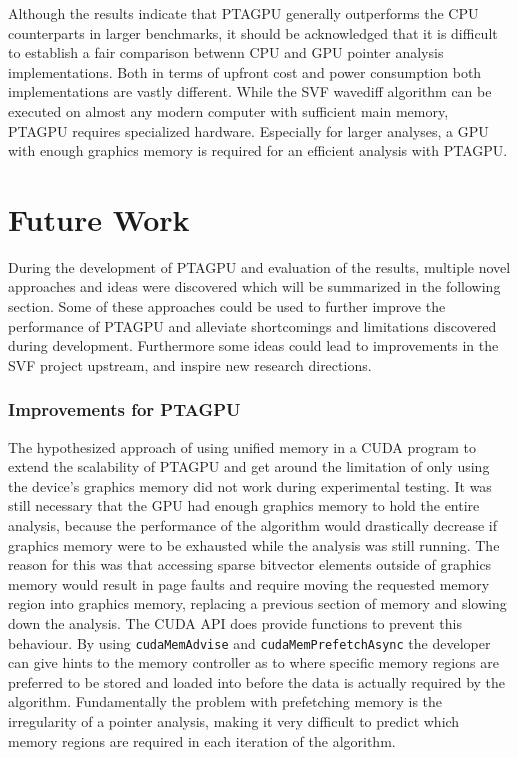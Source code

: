 Although the results indicate that PTAGPU generally outperforms the CPU counterparts in larger benchmarks, it should be acknowledged that it is difficult to establish a fair comparison betwenn CPU and GPU pointer analysis implementations.
Both in terms of upfront cost and power consumption both implementations are vastly different. While the SVF wavediff algorithm can be executed on almost any modern computer with sufficient main memory, PTAGPU requires specialized hardware. Especially for larger analyses, a GPU with enough graphics memory is required for an efficient analysis with PTAGPU.

\section{Future Work}
During the development of PTAGPU and evaluation of the results, multiple novel approaches and ideas were discovered which will be summarized in the following section.
Some of these approaches could be used to further improve the performance of PTAGPU and alleviate shortcomings and limitations discovered during development.
Furthermore some ideas could lead to improvements in the SVF project upstream, and inspire new research directions.

\subsubsection{Improvements for PTAGPU}
The hypothesized approach of using unified memory in a CUDA program to extend the scalability of PTAGPU and get around the limitation of only using the device's graphics memory did not work during experimental testing.
It was still necessary that the GPU had enough graphics memory to hold the entire analysis, because the performance of the algorithm would drastically decrease if graphics memory were to be exhausted while the analysis was still running. The reason for this was that accessing sparse bitvector elements outside of graphics memory would result in page faults and require moving the requested memory region into graphics memory, replacing a previous section of memory and slowing down the analysis.
The CUDA API does provide functions to prevent this behaviour. By using \verb|cudaMemAdvise| and \verb|cudaMemPrefetchAsync| the developer can give hints to the memory controller as to where specific memory regions are preferred to be stored and loaded into before the data is actually required by the algorithm.
Fundamentally the problem with prefetching memory is the irregularity of a pointer analysis, making it very difficult to predict which memory regions are required in each iteration of the algorithm.

